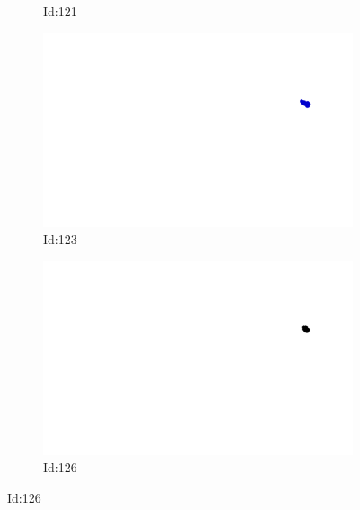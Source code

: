 \documentclass[12pt,twoside]{report}
\begin{document}
\begin{figure}
\begin{subfigure}[b]{0.20\textwidth}
\caption{Id:121}
\end{subfigure}
\begin{subfigure}[b]{0.20\textwidth}
\centering
\includegraphics[width=\textwidth]{../../trajectories/123.png}
\caption{Id:123}
\end{subfigure}
\begin{subfigure}[b]{0.20\textwidth}
\centering
\includegraphics[width=\textwidth]{../../trajectories/126.png}
\caption{Id:126}
\end{subfigure}
\end{figure}
\end{document}
